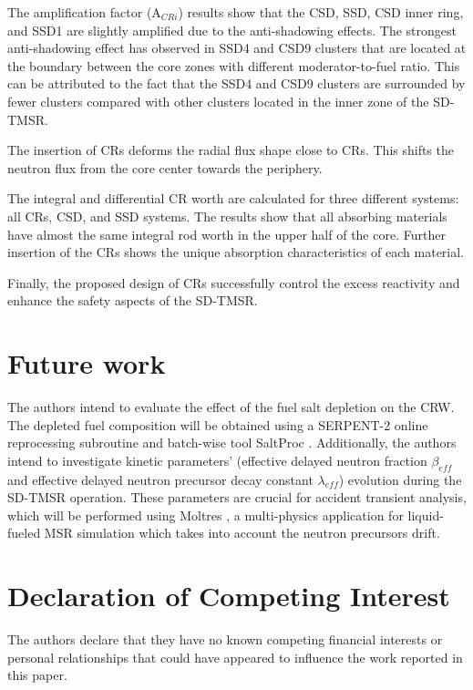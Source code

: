 The amplification factor (A$_{CRi}$) results show that the CSD, SSD, CSD inner ring, and SSD1 are slightly amplified due to the anti-shadowing effects. The strongest anti-shadowing effect has observed in SSD4 and CSD9 clusters that are located at the boundary between the core zones with different moderator-to-fuel ratio. This can be attributed to the fact that the SSD4 and CSD9 clusters are surrounded by fewer clusters compared with other clusters located in the inner zone of the SD-TMSR.

The insertion of CRs deforms the radial flux shape close to CRs. This shifts the neutron flux from the core center towards the periphery.

The integral and differential CR worth are calculated for three 
different systems: all CRs, CSD, and SSD systems. The results show 
that all absorbing materials have almost the same integral rod worth in the 
upper half of the core. Further insertion of the CRs shows the unique 
absorption characteristics of each material.

Finally, the proposed design of CRs successfully control the excess reactivity and enhance the safety aspects of the SD-TMSR.

\section{Future work}
The authors intend to evaluate the effect of the fuel salt 
depletion on the CRW. The depleted fuel composition will be obtained using a
SERPENT-2 online reprocessing subroutine and 
batch-wise tool SaltProc \cite{rykhlevskii_arfc/saltproc_2018}. Additionally, the authors intend to investigate
kinetic parameters' (effective delayed neutron fraction $\beta_{eff}$ and 
effective delayed neutron precursor decay constant $\lambda_{eff}$) evolution 
during the SD-TMSR operation. These parameters are crucial for accident 
transient analysis, which will be performed using Moltres 
\cite{lindsay_introduction_2018}, a multi-physics application for liquid-fueled MSR 
simulation which takes into account the neutron precursors drift.

\section{Declaration of Competing Interest}

The authors declare that they have no known competing financial interests or personal relationships that could have appeared to influence the work reported in this paper.
